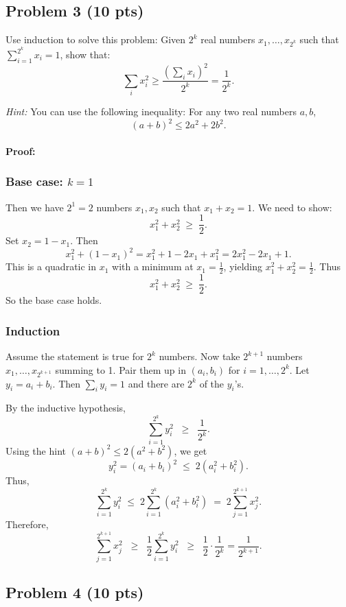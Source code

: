 \documentclass[12pt]{article}
\begin{document}
\subsection*{Problem 3 (10 pts)}

Use induction to solve this problem: Given $2^k$ real numbers $x_1, \ldots, x_{2^k}$ such that $\sum_{i=1}^{2^k} x_i = 1$, show that:
\[
\sum_{i} x_i^2 \geq \frac{\left(\sum_{i} x_i\right)^2}{2^k} = \frac{1}{2^k}.
\]

\textit{Hint:} You can use the following inequality: For any two real numbers $a, b$, 
\[
(a+b)^2 \leq 2a^2 + 2b^2.
\]

\paragraph{Proof:}

\subsubsection*{Base case: $k=1$}
Then we have $2^1 = 2$ numbers $x_1, x_2$ such that $x_1 + x_2 = 1$. We need to show:
\[
x_1^2 + x_2^2 \;\ge\; \frac{1}{2}.
\]
Set $x_2 = 1 - x_1$. Then
\[
x_1^2 + (1 - x_1)^2 = x_1^2 + 1 - 2x_1 + x_1^2 = 2x_1^2 - 2x_1 + 1.
\]
This is a quadratic in $x_1$ with a minimum at $x_1 = \tfrac12$, yielding $x_1^2 + x_2^2 = \tfrac12$. Thus 
\[
x_1^2 + x_2^2 \;\ge\; \frac12.
\]
So the base case holds.

\subsubsection*{Induction}
Assume the statement is true for $2^k$ numbers. Now take $2^{k+1}$ numbers $x_1,\dots, x_{2^{k+1}}$ summing to 1. Pair them up in $(a_i,b_i)$ for $i=1,\ldots, 2^k$. Let $y_i = a_i + b_i$. Then $\sum_i y_i = 1$ and there are $2^k$ of the $y_i$'s.

By the inductive hypothesis,
\[
\sum_{i=1}^{2^k} y_i^2 \;\;\ge\;\; \frac{1}{2^k}.
\]
Using the hint $(a+b)^2 \le 2(a^2 + b^2)$, we get
\[
y_i^2 = (a_i + b_i)^2 \;\le\; 2(a_i^2 + b_i^2).
\]
Thus,
\[
\sum_{i=1}^{2^k} y_i^2 \;\le\; 2 \sum_{i=1}^{2^k} (a_i^2 + b_i^2) \;=\; 2 \sum_{j=1}^{2^{k+1}} x_j^2.
\]
Therefore,
\[
\sum_{j=1}^{2^{k+1}} x_j^2 
\;\;\ge\;\; \frac{1}{2} \sum_{i=1}^{2^k} y_i^2 
\;\;\ge\;\; \frac{1}{2} \cdot \frac{1}{2^k}
= \frac{1}{2^{k+1}}.
\]

\subsection*{Problem 4 (10 pts)}
\end{document}
